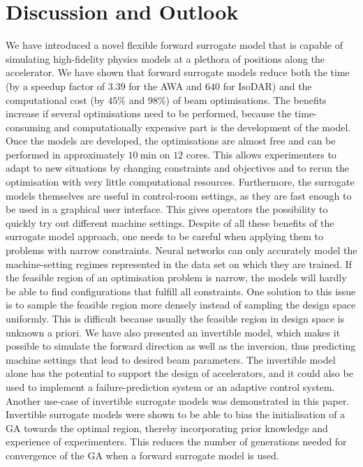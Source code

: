 \documentclass[a4paper, 12pt, version-1-compatibility]{article}
\def\isodar{IsoDAR}
\begin{document}
\section*{Discussion and Outlook}
We have introduced a novel flexible forward surrogate model that is capable of simulating high-fidelity physics models at a plethora of positions along the accelerator. 
We have shown that forward surrogate models reduce both the time (by a speedup factor of $3.39$ for the AWA and $640$ for \isodar) and the computational cost (by $45\%$ and $98\%$) of beam optimisations. The benefits increase if several optimisations need to be performed, because the time-consuming and computationally expensive part is the development of the model. Once the models are developed, the optimisations are almost free and can be performed in approximately $10~\mathrm{min}$ on $12$ cores. This allows experimenters to adapt to new situations by changing constraints and objectives and to rerun the optimisation with very little computational resources. Furthermore, the surrogate models themselves are useful in control-room settings, as they are fast enough to be used in a graphical user interface. This gives operators the possibility to quickly try out different machine settings. Despite of all these benefits of the surrogate model approach, one needs to be careful when applying them to problems with narrow constraints. Neural networks can only accurately model the machine-setting regimes represented in the data set on which they are trained. If the feasible region of an optimisation problem is narrow, the models will hardly be able to find configurations that fulfill all constraints. One solution to this issue is to sample the feasible region more densely instead of sampling the design space uniformly. This is difficult because usually the feasible region in design space is unknown a priori.
We have also presented an invertible model, which makes it possible to simulate the forward direction as well as the inversion, thus predicting machine settings that lead to desired beam parameters. The invertible model alone has the potential to support the design of accelerators, and it could also be used to implement a failure-prediction system or an adaptive control system. 
Another use-case of invertible surrogate models was demonstrated in this paper. Invertible surrogate models were shown to be able to bias the initialisation of a GA towards the optimal region, thereby incorporating prior knowledge and experience of experimenters. This reduces the number of generations needed for convergence of the GA when a forward surrogate model is used. 
\end{document}
